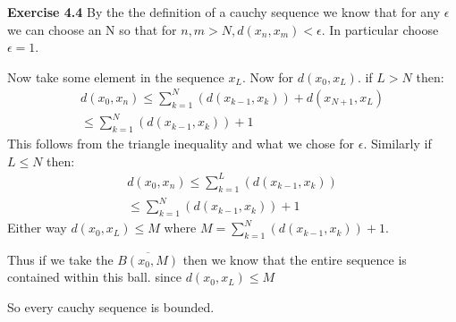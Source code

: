 \documentclass[12pt]{article}
\newenvironment{exercise}[1]{\vspace{.1in}\noindent\textbf{Exercise #1 \hspace{.05em}}}{}
\begin{document}
\begin{exercise}{4.4}
	By the the definition of a cauchy sequence we know that for any $\epsilon$ we can choose an N so that for $n,m>N,d(x_n,x_m)<\epsilon$. In particular choose $\epsilon=1$.

	Now take some element in the sequence $x_L$. Now for $d(x_0,x_L)$. if $L>N$ then:
	\begin{align}
		d(x_0,x_n)\leq \sum\limits_{k=1}^{N}\left(d(x_{k-1},x_k)\right)+d(x_{N+1},x_L) \\
		\leq  \sum\limits_{k=1}^{N}\left(d(x_{k-1},x_k)\right)+1
	\end{align}
	This follows from the triangle inequality and what we chose for $\epsilon$. Similarly if $L\leq N$ then:
	\begin{align}
		d(x_0,x_n)\leq \sum\limits_{k=1}^{L}\left(d(x_{k-1},x_k)\right) \\
		\leq  \sum\limits_{k=1}^{N}\left(d(x_{k-1},x_k)\right)+1
	\end{align}
	Either way $d(x_0,x_L)\leq M$ where $M=\sum\limits_{k=1}^{N}\left(d(x_{k-1},x_k)\right)+1$.

	Thus if we take the $\overline {B(x_0,M)}$ then we know that the entire sequence is contained within this ball. since $d(x_0,x_L)\leq M$

	So every cauchy sequence is bounded.
\end{exercise}
\end{document}

